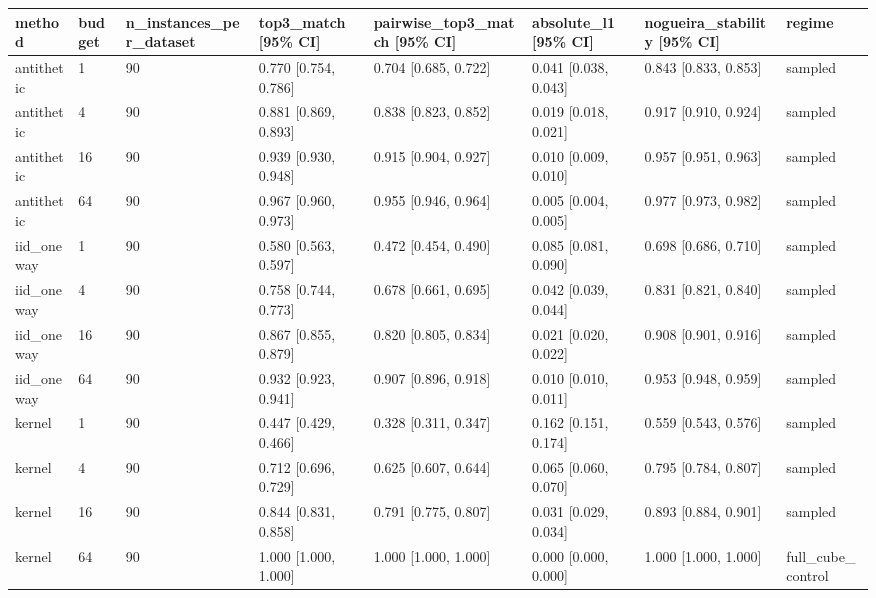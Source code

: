 \begin{tabular}{llllllll}
\toprule
method & budget & n\_instances\_per\_dataset & top3\_match [95\% CI] & pairwise\_top3\_match [95\% CI] & absolute\_l1 [95\% CI] & nogueira\_stability [95\% CI] & regime \\
\midrule
antithetic & 1 & 90 & 0.770 [0.754, 0.786] & 0.704 [0.685, 0.722] & 0.041 [0.038, 0.043] & 0.843 [0.833, 0.853] & sampled \\
antithetic & 4 & 90 & 0.881 [0.869, 0.893] & 0.838 [0.823, 0.852] & 0.019 [0.018, 0.021] & 0.917 [0.910, 0.924] & sampled \\
antithetic & 16 & 90 & 0.939 [0.930, 0.948] & 0.915 [0.904, 0.927] & 0.010 [0.009, 0.010] & 0.957 [0.951, 0.963] & sampled \\
antithetic & 64 & 90 & 0.967 [0.960, 0.973] & 0.955 [0.946, 0.964] & 0.005 [0.004, 0.005] & 0.977 [0.973, 0.982] & sampled \\
iid\_oneway & 1 & 90 & 0.580 [0.563, 0.597] & 0.472 [0.454, 0.490] & 0.085 [0.081, 0.090] & 0.698 [0.686, 0.710] & sampled \\
iid\_oneway & 4 & 90 & 0.758 [0.744, 0.773] & 0.678 [0.661, 0.695] & 0.042 [0.039, 0.044] & 0.831 [0.821, 0.840] & sampled \\
iid\_oneway & 16 & 90 & 0.867 [0.855, 0.879] & 0.820 [0.805, 0.834] & 0.021 [0.020, 0.022] & 0.908 [0.901, 0.916] & sampled \\
iid\_oneway & 64 & 90 & 0.932 [0.923, 0.941] & 0.907 [0.896, 0.918] & 0.010 [0.010, 0.011] & 0.953 [0.948, 0.959] & sampled \\
kernel & 1 & 90 & 0.447 [0.429, 0.466] & 0.328 [0.311, 0.347] & 0.162 [0.151, 0.174] & 0.559 [0.543, 0.576] & sampled \\
kernel & 4 & 90 & 0.712 [0.696, 0.729] & 0.625 [0.607, 0.644] & 0.065 [0.060, 0.070] & 0.795 [0.784, 0.807] & sampled \\
kernel & 16 & 90 & 0.844 [0.831, 0.858] & 0.791 [0.775, 0.807] & 0.031 [0.029, 0.034] & 0.893 [0.884, 0.901] & sampled \\
kernel & 64 & 90 & 1.000 [1.000, 1.000] & 1.000 [1.000, 1.000] & 0.000 [0.000, 0.000] & 1.000 [1.000, 1.000] & full\_cube\_control \\
\bottomrule
\end{tabular}
